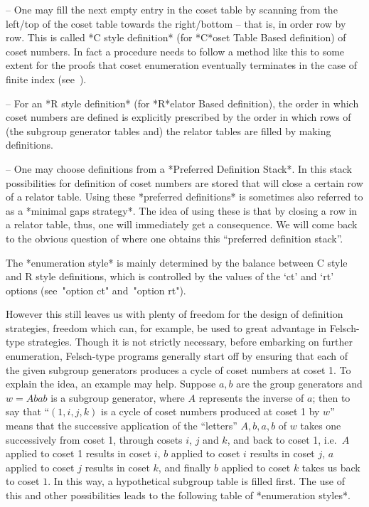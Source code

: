 \beginlist%

\item{--} One may fill the next empty entry  in  the  coset  table  by
scanning from the left/top of the coset table towards the right/bottom
-- that is, in order row by row. This is called *C  style  definition*
(for *C*oset Table Based definition)  of  coset  numbers.  In  fact  a
procedure needs to follow a method like this to some  extent  for  the
proofs that coset enumeration eventually terminates  in  the  case  of
finite index (see~\cite{Neu82}).

\item{--}  For  an  *R  style   definition*   (for   *R*elator   Based
definition),  the  order  in  which  coset  numbers  are  defined   is
explicitly prescribed by the order in  which  rows  of  (the  subgroup
generator  tables  and)  the  relator  tables  are  filled  by  making
definitions.

\item{--} One may choose  definitions  from  a  *Preferred  Definition
Stack*. In this stack possibilities for definition  of  coset  numbers
are stored that will close a certain row of  a  relator  table.  Using
these *preferred definitions* is  sometimes  also  referred  to  as  a
*minimal gaps strategy*. The idea of using these is that by closing  a
row in a relator table, thus, one will immediately get a  consequence.
We will come back to the obvious question of where  one  obtains  this
``preferred definition stack''.

\endlist

The *enumeration style* is mainly determined by  the  balance  between
C style and R style definitions, which is controlled by the values  of
the `ct' and `rt' options (see~"option ct" and~"option rt").

However this still leaves us with plenty of freedom for the design  of
definition strategies, freedom which can,  for  example,  be  used  to
great advantage in Felsch-type strategies. Though it is  not  strictly
necessary,  before  embarking  on  further  enumeration,   Felsch-type
programs generally start off  by  ensuring  that  each  of  the  given
subgroup generators produces a cycle of coset numbers at coset  1.  To
explain the idea, an example may help. Suppose  $a,b$  are  the  group
generators and $w=Abab$ is a subgroup generator, where $A$  represents
the inverse of $a$; then to say that ``$(1,i,j,k)$ is  a  cycle  of
coset numbers produced at coset 1 by $w$'' means  that  the  successive
application  of  the  ``letters''  $A,b,a,b$  of   $w$   takes   one
successively from coset 1, through cosets $i$, $j$ and $k$,  and  back
to coset 1, i.e.~$A$ applied to coset 1  results  in  coset  $i$,  $b$
applied to coset $i$ results in coset $j$, $a$ applied  to  coset  $j$
results in coset $k$, and finally $b$ applied to coset  $k$  takes  us
back to coset $1$. In this  way,  a  hypothetical  subgroup  table  is
filled first. The use of this and other  possibilities  leads  to  the
following table of *enumeration styles*.

